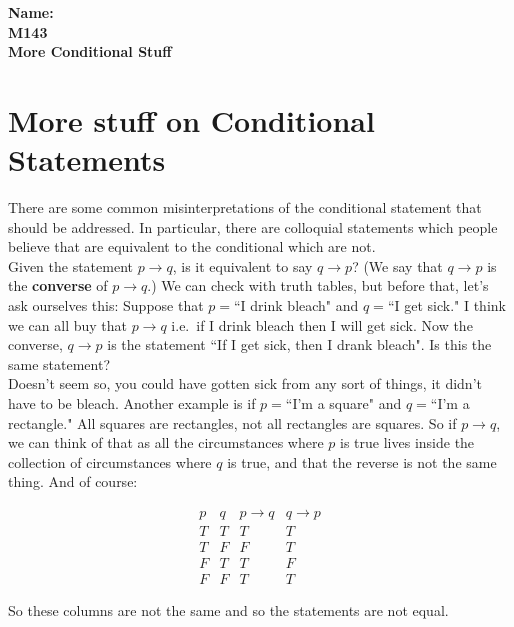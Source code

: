 \documentclass[10pt]{article}
\theoremstyle{definition}
\begin{document}
%

{\bf Name:} \hrulefill\hrulefill\hrulefill\\
{\bf M143} \qquad \qquad \\
{\bf More Conditional Stuff}\\ %



\section{More stuff on Conditional Statements}

There are some common misinterpretations of the conditional statement that should be addressed.  In particular, there are colloquial statements which people believe that are equivalent to the conditional which are not.\\

Given the statement $p\to q$, is it equivalent to say $q\to p$?  (We say that $q\to p$ is the \textbf{converse} of $p\to q$.)  We can check with truth tables, but before that, let's ask ourselves this:  Suppose that $p=$``I drink bleach" and $q=$``I get sick."  I think we can all buy that $p\to q$ i.e.\ if I drink bleach then I will get sick.  Now the converse, $q\to p$ is the statement ``If I get sick, then I drank bleach".  Is this the same statement?\\

Doesn't seem so, you could have gotten sick from any sort of things, it didn't have to be bleach.  Another example is if $p=$``I'm a square" and $q=$``I'm a rectangle."  All squares are rectangles, not all rectangles are squares.  So if $p\to q$, we can think of that as all the circumstances where $p$ is true lives inside the collection of circumstances where $q$ is true, and that the reverse is not the same thing.  And of course:

$$\begin{array}{c|c|c|c}
p & q & p\to q & q\to p\\
\hline
T & T & T & T\\
T & F & F & T\\
F & T & T & F \\
F & F & T & T
\end{array}$$


So these columns are not the same and so the statements are not equal.\\
\end{document}
